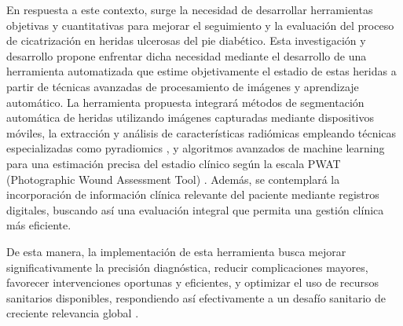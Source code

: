 En respuesta a este contexto, surge la necesidad de desarrollar herramientas objetivas y cuantitativas para mejorar el seguimiento y la evaluación del proceso de cicatrización en heridas ulcerosas del pie diabético. Esta investigación y desarrollo propone enfrentar dicha necesidad mediante el desarrollo de una herramienta automatizada que estime objetivamente el estadio de estas heridas a partir de técnicas avanzadas de procesamiento de imágenes y aprendizaje automático. La herramienta propuesta integrará métodos de segmentación automática de heridas utilizando imágenes capturadas mediante dispositivos móviles, la extracción y análisis de características radiómicas empleando técnicas especializadas como pyradiomics \cite{van2017computational}, y algoritmos avanzados de machine learning para una estimación precisa del estadio clínico según la escala PWAT (Photographic Wound Assessment Tool) \cite{thompson2013reliability}. Además, se contemplará la incorporación de información clínica relevante del paciente mediante registros digitales, buscando así una evaluación integral que permita una gestión clínica más eficiente.

De esta manera, la implementación de esta herramienta busca mejorar significativamente la precisión diagnóstica, reducir complicaciones mayores, favorecer intervenciones oportunas y eficientes, y optimizar el uso de recursos sanitarios disponibles, respondiendo así efectivamente a un desafío sanitario de creciente relevancia global \cite{organizacion2016informe}.